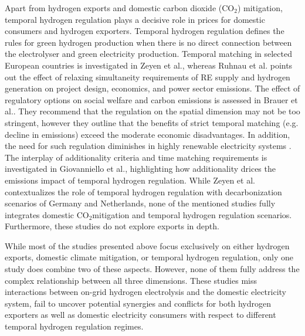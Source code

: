 \documentclass[5p,numafflabel]{elsarticle}
\newcommand{\co}{\ce{CO2}~}
\def\co{CO${}_2${\:}}
\begin{document}
Apart from hydrogen exports and domestic carbon dioxide (CO${}_2$) mitigation, temporal hydrogen regulation plays a decisive role in prices for domestic consumers and hydrogen exporters. 
Temporal hydrogen regulation defines the rules for green hydrogen production when there is no direct connection between the electrolyser and green electricity production.
Temporal matching in selected European countries is investigated in Zeyen et al.\cite{Zeyen2024}, whereas Ruhnau et al.\cite{Ruhnau2023a} points out the effect of relaxing simultaneity requirements of RE supply and hydrogen generation on project design, economics, and power sector emissions.
The effect of regulatory options on social welfare and carbon emissions is assessed in Brauer et al.\cite{Brauer2022}. They recommend that the regulation on the spatial dimension may not be too stringent, however they outline that the benefits of strict temporal matching (e.g. decline in emissions) exceed the moderate economic disadvantages. In addition, the need for such regulation diminishes in highly renewable electricity systems \cite{Brauer2022}.
The interplay of additionality criteria and time matching requirements is investigated in Giovanniello et al.\cite{Giovanniello2024}, highlighting how additionality drices the emissions impact of temporal hydrogen regulation.
While Zeyen et al.\cite{Zeyen2024} contextualizes the role of temporal hydrogen regulation with decarbonization scenarios of Germany and Netherlands, none of the mentioned studies fully integrates domestic \co mitigation and temporal hydrogen regulation scenarios. Furthermore, these studies do not explore exports in depth.

While most of the studies presented above focus exclusively on either hydrogen exports, domestic climate mitigation, or temporal hydrogen regulation, only one study\cite{Muller2024} does combine two of these aspects. However, none of them fully address the complex relationship between all three dimensions. 
These studies miss interactions between on-grid hydrogen electrolysis and the domestic electricity system, fail to uncover potential synergies and conflicts for both hydrogen exporters as well as domestic electricity consumers with respect to different temporal hydrogen regulation regimes.
\end{document}
